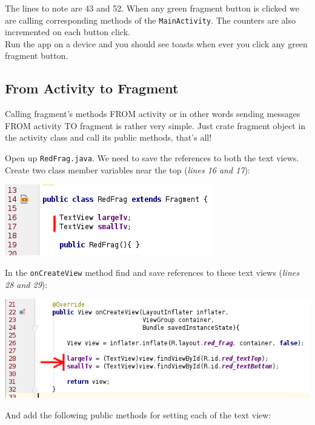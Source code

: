 The lines to note are 43 and 52. When any green fragment button is clicked we are calling corresponding methods of the \texttt{MainActivity}. The counters are also incremented on each button click. \\

Run the app on a device and you should see toasts when ever you click any green fragment button.

\subsection{From Activity to Fragment}
\label{FRAG:fromActivityToFragment}

Calling fragment's methods FROM activity or in other words sending messages FROM activity TO fragment is rather very simple. Just crate fragment object in the activity class and call its public methods, that's all! 

Open up \texttt{RedFrag.java}. We need to save the references to both the text views. Create two class member variables near the top (\textit{lines 16 and 17}):

\begin{center}
	\includegraphics[scale=\SourceCodeScale]{chapters/ch11/images/31}
\end{center}

In the \texttt{onCreateView} method find and save references to these text views (\textit{lines 28 and 29}):

\begin{center}
	\includegraphics[scale=\SourceCodeScale]{chapters/ch11/images/32}
\end{center}

And add the following public methods for setting each of the text view:

